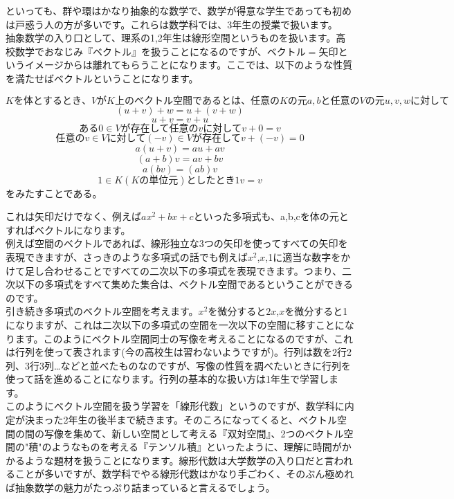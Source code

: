 
といっても、群や環はかなり抽象的な数学で、数学が得意な学生であっても初めは戸惑う人の方が多いです。これらは数学科では、3年生の授業で扱います。\\
抽象数学の入り口として、理系の1,2年生は線形空間というものを扱います。高校数学でおなじみ『ベクトル』を扱うことになるのですが、$ベクトル = 矢印$というイメージからは離れてもらうことになります。ここでは、以下のような性質を満たせばベクトルということになります。

\[
Kを体とするとき、VがK上のベクトル空間であるとは、任意のKの元a,bと任意のVの元u,v,wに対して
\]
\[
(u + v) + w = u + (v + w)
\]
\[
u + v = v + u
\]
\[
ある0 \in V が存在して任意のvに対して v + 0 = v
\]
\[
任意のv \in V に対して (-v) \in Vが存在して v + (-v) = 0
\]
\[
a(u + v) = au + av
\]
\[
(a + b)v = av + bv
\]
\[
a(bv) = (ab)v
\]
\[
1 \in K(Kの単位元)としたとき 1v = v
\]
をみたすことである。



これは矢印だけでなく、例えば$ax^2 + bx + c$といった多項式も、a,b,cを体の元とすればベクトルになります。\\
例えば空間のベクトルであれば、線形独立な3つの矢印を使ってすべての矢印を表現できますが、さっきのような多項式の話でも例えば$x ^ 2$,$x$,1に適当な数字をかけて足し合わせることですべての二次以下の多項式を表現できます。つまり、二次以下の多項式をすべて集めた集合は、ベクトル空間であるということができるのです。\\
引き続き多項式のベクトル空間を考えます。$x^2$を微分すると$2x$,$x$を微分すると1になりますが、これは二次以下の多項式の空間を一次以下の空間に移すことになります。このようにベクトル空間同士の写像を考えることになるのですが、これは行列を使って表されます(今の高校生は習わないようですが)。行列は数を2行2列、3行3列…などと並べたものなのですが、写像の性質を調べたいときに行列を使って話を進めることになります。行列の基本的な扱い方は1年生で学習します。\\
このようにベクトル空間を扱う学習を「線形代数」というのですが、数学科に内定が決まった2年生の後半まで続きます。そのころになってくると、ベクトル空間の間の写像を集めて、新しい空間として考える『双対空間』、2つのベクトル空間の"積"のようなものを考える『テンソル積』といったように、理解に時間がかかるような題材を扱うことになります。線形代数は大学数学の入り口だと言われることが多いですが、数学科でやる線形代数はかなり手ごわく、そのぶん極めれば抽象数学の魅力がたっぷり詰まっていると言えるでしょう。